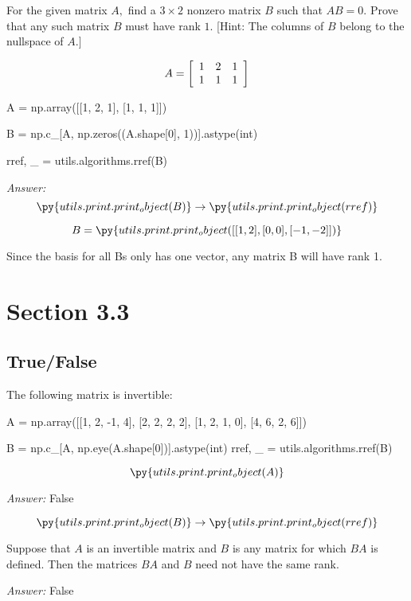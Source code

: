 \documentclass[letterpaper]{article}
\newcommand{\ans}{\textit{Answer: }}
\newenvironment{question}[2][Question]{\begin{trivlist}
\item[\hskip \labelsep {\bfseries #1}\hskip \labelsep {\bfseries #2.}]}{\end{trivlist}}
\newcommand{\printobj}[1]{\py{utils.print.print_object(#1)}}
\begin{document}
\begin{question}{3.41}
  For the given matrix $A ,$ find a $3 \times 2$ nonzero matrix $B$ such that $A B = 0 .$ Prove
  that any such matrix $B$ must have rank $1 .$ [Hint: The columns of $B$ belong to
  the nullspace of $A . ]$

  $$A = \left[ \begin{array} { l l l } { 1 } & { 2 } & { 1 } \\ { 1 } & { 1 } & { 1 } \end{array} \right]$$

  \begin{pycode}
A = np.array([[1, 2, 1], [1, 1, 1]])

B = np.c_[A, np.zeros((A.shape[0], 1))].astype(int)

rref, _ = utils.algorithms.rref(B)
  \end{pycode}

  \ans 
  $$\printobj{B} \rightarrow \printobj{rref}$$

  $$B = \printobj{[
    [1, 2],
    [0, 0],
    [-1, -2]
  ]}$$

  Since the basis for all Bs only has one vector, any matrix B will have rank 1.
\end{question}

\section{Section 3.3}
\subsection{True/False}

\begin{question}{3.21}
  The following matrix is invertible:

  \begin{pycode}
A = np.array([[1, 2, -1, 4], [2, 2, 2, 2], [1, 2, 1, 0], [4, 6, 2, 6]])

B = np.c_[A, np.eye(A.shape[0])].astype(int)
rref, _ = utils.algorithms.rref(B)
  \end{pycode}

  $$\printobj{A}$$
  
  \ans False

  $$\printobj{B} \rightarrow \printobj{rref}$$
\end{question}

\begin{question}{3.23}
  Suppose that $A$ is an invertible matrix and $B$ is any matrix for which $B A$ is
  defined. Then the matrices $B A$ and $B$ need not have the same rank.
  
  \ans False
\end{question}
\end{document}
